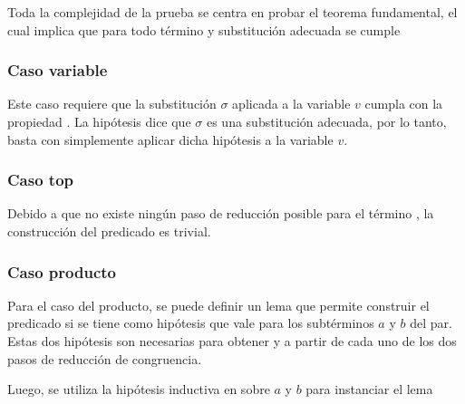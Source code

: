 
Toda la complejidad de la prueba se centra en probar el teorema fundamental, el cual implica que para todo término  y substitución adecuada  se cumple
\snstar{}


\subsubsection{Caso variable}

Este caso requiere que la substitución $\sigma$ aplicada a la variable $v$ cumpla con la propiedad
\snstar.
La hipótesis dice que $\sigma$ es una substitución adecuada, por lo tanto, basta con simplemente aplicar dicha hipótesis a la variable $v$.


\subsubsection{Caso top}

Debido a que no existe ningún paso de reducción posible para el término \const{$\star$}, la construcción del predicado es trivial.


\subsubsection{Caso producto}

Para el caso del producto, se puede definir un lema que permite construir el predicado si se tiene como hipótesis que \snstar vale para los subtérminos $a$ y $b$ del par.
Estas dos hipótesis son necesarias para obtener \snstar {} y \snstar {} a partir de cada uno de los dos pasos de reducción de congruencia.


Luego, se utiliza la hipótesis inductiva en  sobre $a$ y $b$ para instanciar el lema


